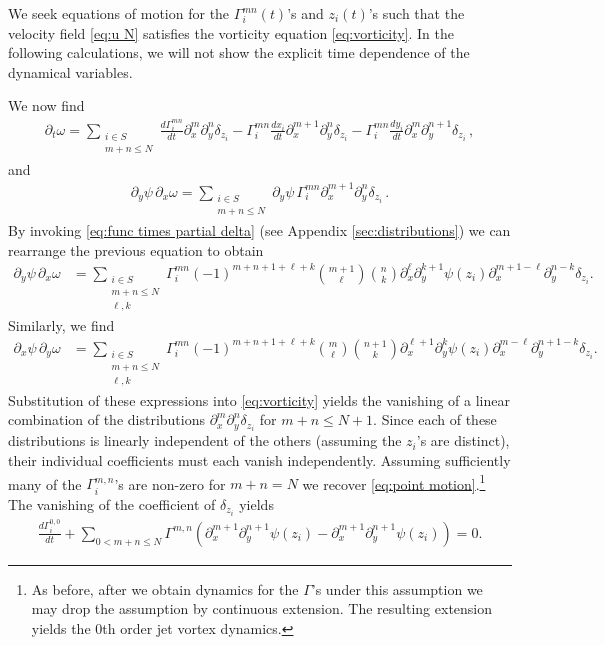 \documentclass[12pt]{amsart}
\theoremstyle{remark}
\begin{document}
We seek equations of motion for the $\Gamma^{mn}_i(t)$'s and $z_i(t)$'s
such that the velocity field \eqref{eq:u N} satisfies the vorticity equation \eqref{eq:vorticity}.
In the following calculations, we will not show the explicit time dependence of the dynamical variables.


We now find
\begin{align*}
  \partial_t \omega =	
  \sum_{
  	\substack{
		i \in S \\
		m+n \leq N}}
  	\frac{d \Gamma_i^{mn}}{dt} \partial_x^m \partial_y^n \delta_{z_i} - \Gamma_i^{mn} \frac{dx_i}{dt} \partial_{x}^{m+1} \partial_y^{n} \delta_{z_i}
	- \Gamma_i^{mn} \frac{dy_i}{dt} \partial_{x}^{m} \partial_y^{n+1} \delta_{z_i}\,,
\end{align*}
and
\begin{align*}
  \partial_y \psi \, \partial_x \omega = 
  \sum_{
  	\substack{
		i \in S \\
		m+n \leq N}}
   \partial_y \psi \, \Gamma_i ^{mn}\partial_x^{m+1} \partial_y^n \delta_{z_i}\,.
\end{align*}
By invoking \eqref{eq:func times partial delta} (see Appendix
\ref{sec:distributions}) we can rearrange the previous equation to
obtain
\begin{align*}
  \partial_y \psi \, \partial_x \omega &=
  \sum_{
  	\substack{
		i \in S \\
		m+n \leq N \\
		\ell,k}}
	\Gamma_i^{mn} (-1)^{m+n+1 + \ell + k} \binom{m+1}{\ell} \binom{n}{k} \partial_x^{\ell} \partial_y^{k+1} \psi(z_i) \partial_x^{m+1-\ell} \partial_y^{n-k} \delta_{z_i}.
\end{align*}
Similarly, we find
\begin{align*}
  \partial_x \psi \, \partial_y \omega &=
  \sum_{
  	\substack{
		i \in S \\
		m+n \leq N\\
		\ell,k}
	}
	\Gamma_i^{mn} (-1)^{m+n+1 + \ell + k} \binom{m}{\ell} \binom{n+1}{k} \partial_x^{\ell+1} \partial_y^k \psi(z_i) \partial_x^{m-\ell} \partial_y^{n+1-k} \delta_{z_i}.
\end{align*}
Substitution of these expressions into \eqref{eq:vorticity} yields
the vanishing of a linear combination of the distributions
$\partial_x^m \partial_y^n \delta_{z_i}$
for $m+n \leq N+1$.
Since each of these distributions is linearly independent
of the others (assuming the $z_i$'s are distinct),
their individual coefficients must each vanish independently.
Assuming sufficiently many of the $\Gamma_i^{m,n}$'s are non-zero 
for $m+n = N$ we recover \eqref{eq:point motion}.\footnote{
  As before, after we obtain dynamics for the $\Gamma$'s under this assumption
  we may drop the assumption by continuous extension.
  The resulting extension yields the $0$th order
  jet vortex dynamics.
}
The vanishing of the coefficient of $\delta_{z_i}$ yields
\begin{align*}
	\frac{d\Gamma^{0,0}_i}{dt} + \sum_{0 < m+n \leq N} \Gamma^{m,n} ( \partial_x^{m+1}\partial_y^{n+1} \psi(z_i) - \partial_x^{m+1}\partial_y^{n+1} \psi(z_i) ) = 0.
\end{align*}
\end{document}

